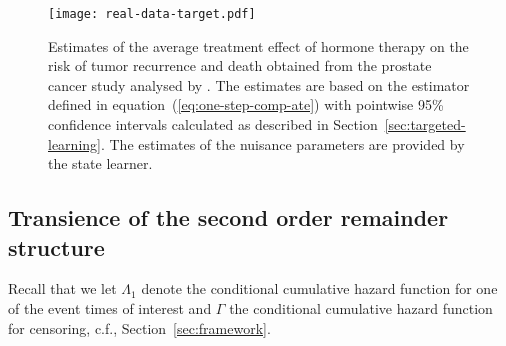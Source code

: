 \begin{figure}
  \centering%
  \texttt{[image: real-data-target.pdf]}
  \caption[]{Estimates of the average treatment effect of hormone therapy on the
    risk of tumor recurrence and death obtained from the prostate cancer study
    analysed by \cite{kattan2000pretreatment}. The estimates are based on the
    estimator defined in equation~(\ref{eq:one-step-comp-ate}) with pointwise
    95\% confidence intervals calculated as described in
    Section~\ref{sec:targeted-learning}. The estimates of the nuisance
    parameters are provided by the state learner.}
  \label{fig:zelefski-real-target}
\end{figure}


\appendix

\subsection{Transience of the second order remainder structure}
\label{sec:state-learner-with}

Recall that we let $\Lambda_1$ denote the conditional cumulative hazard function
for one of the event times of interest and $\Gamma$ the conditional cumulative
hazard function for censoring, c.f., Section~\ref{sec:framework}.

